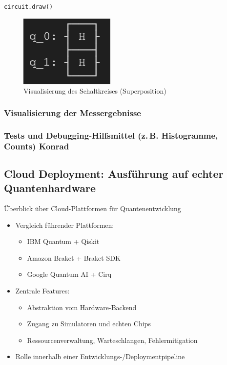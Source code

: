 \begin{verbatim}
circuit.draw()
\end{verbatim}

  \centering
  \begin{figure}
      \includegraphics[width=0.25\linewidth]{circuit_superposition.png}
      \caption{Visualisierung des Schaltkreises (Superposition)}
      \label{fig:enter-label}
\end{figure}

\subsubsection*{Visualisierung der Messergebnisse}


\subsubsection{Tests und Debugging-Hilfsmittel (z.\,B. Histogramme, Counts) Konrad}



\subsection{Cloud Deployment: Ausführung auf echter Quantenhardware}

Überblick über Cloud-Plattformen für Quantenentwicklung

\begin{itemize}
    \item Vergleich führender Plattformen:
    \begin{itemize}
        \item IBM Quantum + Qiskit
        \item Amazon Braket + Braket SDK
        \item Google Quantum AI + Cirq
    \end{itemize}
    \item Zentrale Features:
    \begin{itemize}
        \item Abstraktion vom Hardware-Backend
        \item Zugang zu Simulatoren und echten Chips
        \item Ressourcenverwaltung, Warteschlangen, Fehlermitigation
    \end{itemize}
    \item Rolle innerhalb einer Entwicklungs-/Deploymentpipeline
\end{itemize}


